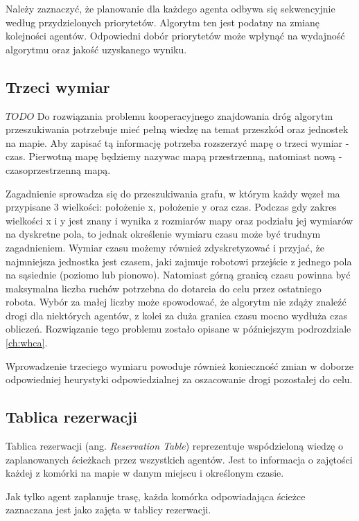 Należy zaznaczyć, że planowanie dla każdego agenta odbywa się sekwencyjnie według przydzielonych priorytetów.
Algorytm ten jest podatny na zmianę kolejności agentów. Odpowiedni dobór priorytetów może wpłynąć na wydajność algorytmu oraz jakość uzyskanego wyniku.

\subsection{Trzeci wymiar}
$TODO$
Do rozwiązania problemu kooperacyjnego znajdowania dróg algorytm przeszukiwania potrzebuje mieć pełną wiedzę na temat przeszkód oraz jednostek na mapie.
Aby zapisać tą informację potrzeba rozszerzyć mapę o trzeci wymiar - czas. 
Pierwotną mapę będziemy nazywac mapą przestrzenną, natomiast nową - czasoprzestrzenną mapą. \cite{cooppath}

Zagadnienie sprowadza się do przeszukiwania grafu, w którym każdy węzeł ma przypisane 3 wielkości: położenie x, położenie y oraz czas.
Podczas gdy zakres wielkości x i y jest znany i wynika z rozmiarów mapy oraz podziału jej wymiarów na dyskretne pola, to jednak określenie wymiaru czasu może być trudnym zagadnieniem.
Wymiar czasu możemy również zdyskretyzować i przyjać, że najmniejsza jednostka jest czasem, jaki zajmuje robotowi przejście z jednego pola na sąsiednie (poziomo lub pionowo). Natomiast górną granicą czasu powinna być maksymalna liczba ruchów potrzebna do dotarcia do celu przez ostatniego robota. Wybór za małej liczby może spowodować, że algorytm nie zdąży znaleźć drogi dla niektórych agentów, z kolei za duża granica czasu mocno wydłuża czas obliczeń. Rozwiązanie tego problemu zostało opisane w późniejszym podrozdziale \ref{ch:whca}.

Wprowadzenie trzeciego wymiaru powoduje również konieczność zmian w doborze odpowiedniej heurystyki odpowiedzialnej za oszacowanie drogi pozostałej do celu.

\subsection{Tablica rezerwacji}
Tablica rezerwacji (ang. {\it Reservation Table}) reprezentuje wspódzieloną wiedzę o zaplanowanych ścieżkach przez wszystkich agentów.
Jest to informacja o zajętości każdej z komórki na mapie w danym miejscu i określonym czasie. \cite{cooppath}

Jak tylko agent zaplanuje trasę, każda komórka odpowiadająca ścieżce zaznaczana jest jako zajęta w tablicy rezerwacji.


